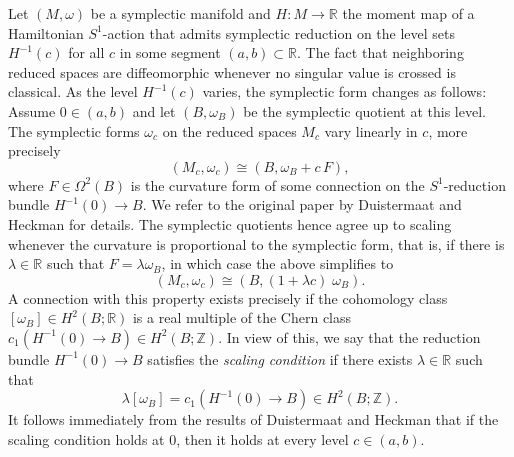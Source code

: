 \documentclass[10pt,oneside,reqno]{amsart}
\theoremstyle{definition}
\newcommand{\IR}{\mathbb{R}}
\newcommand{\IZ}{\mathbb{Z}}
\begin{document}
Let $(M,\omega)$ be a symplectic manifold and $H \colon M \rightarrow \IR$ the moment map of a Hamiltonian $S^1$-action that admits symplectic reduction on the level sets $H^{-1}(c)$ for all $c$ in some segment $(a,b) \subset \IR$. The fact that neighboring reduced spaces are diffeomorphic whenever no singular value is crossed is classical. As the level $H^{-1}(c)$ varies, the symplectic form changes as follows: Assume $0\in (a,b)$ and let $(B,\omega_B)$ be the symplectic quotient at this level. The symplectic forms $\omega_c$ on the reduced spaces $M_c$ vary linearly in $c$, more precisely
\begin{equation*}
    (M_c,\omega_c)\cong (B,\omega_B + c \, F) ,
\end{equation*}
where $F\in \Omega^2(B)$ is the curvature form of some connection on the $S^1$-reduction bundle $H^{-1}(0)\to B$. We refer to the original paper \cite{duistermaat1982variation} by Duistermaat and Heckman for details. The symplectic quotients hence agree up to scaling whenever the curvature is proportional to the symplectic form, that is, if there is $\lambda \in \IR$ such that $F = \lambda \omega_B$, in which case the above simplifies to
\begin{equation*} 
    (M_c,\omega_c) \cong (B,(1+\lambda c)\;\omega_B).
\end{equation*}
A connection with this property exists precisely if the cohomology class $ [\omega_B]\in H^2(B;\IR)$ is a real multiple of the Chern class $c_1(H^{-1}(0)\to B)\in H^2(B;\IZ)$. In view of this, we say that the reduction bundle $H^{-1}(0) \to B$ satisfies the \emph{scaling condition} if there exists $\lambda \in \IR$ such that 
\begin{equation}\label{eq:scaling}
    \lambda [\omega_B] = c_1\left(H^{-1}(0) \to B \right)\in H^2(B;\IZ).
\end{equation}
It follows immediately from the results of Duistermaat and Heckman that if the scaling condition holds at $0$, then it holds at every level $c\in (a,b)$.
\end{document}
